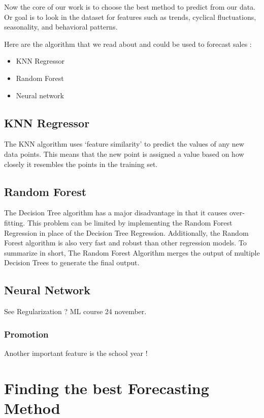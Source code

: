 \documentclass{report}
\begin{document}
Now the core of our work is to choose the best method to predict from our data. Or goal is to look in the dataset for features such as trends, cyclical fluctuations, seasonality, and behavioral patterns.


Here are the algorithm that we read about and could be used to forecast sales :
\begin{itemize}
\item KNN Regressor
\item Random Forest
\item Neural network
\end{itemize}

\section{KNN Regressor}

The KNN algorithm uses ‘feature similarity’ to predict the values of any new data points. This means that the new point is assigned a value based on how closely it resembles the points in the training set.


\section{Random Forest}

The Decision Tree algorithm has a major disadvantage in that it causes over-fitting.
This problem can be limited by implementing the Random Forest Regression in place of the Decision Tree Regression. Additionally, the Random Forest algorithm is also very fast and robust than other regression models.
To summarize in short, The Random Forest Algorithm merges the output of multiple Decision Trees to generate the final output.

\section{Neural Network}




See Regularization ? ML course 24 november.


\subsection{Promotion}
Another important feature is the school year !

\chapter{Finding the best Forecasting Method}
\end{document}
